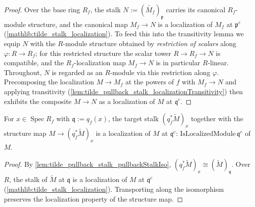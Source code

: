 \begin{proof}
  \leanok
  Over the base ring \(R_f\), the stalk \(N:=(\widetilde{M_f})_{\mathfrak p}\) carries its
  canonical \(R_f\)-module structure, and the canonical map \(M_f\to N\) is a localization
  of \(M_f\) at \(\mathfrak p^{c}\) (\cref{mathlib:tilde_stalk_localization}).  To feed this
  into the transitivity lemma we equip \(N\) with the \(R\)-module structure obtained by
  \emph{restriction of scalars} along \(\varphi:R\to R_f\); for this restricted structure
  the scalar tower \(R\to R_f\to N\) is compatible, and the \(R_f\)-localization map
  \(M_f\to N\) is in particular \(R\)-linear.  Throughout, \(N\) is regarded as an
  \(R\)-module via this restriction along \(\varphi\).
  Precomposing the localization \(M\to M_f\) at the powers of \(f\) with \(M_f\to N\) and
  applying transitivity (\cref{lem:tilde_pullback_stalk_localizationTransitivity}) then
  exhibits the composite \(M\to N\) as a localization of \(M\) at \(\mathfrak q^{c}\).
\end{proof}


\begin{lemma}
  \label{lem:tilde_pullback_stalk_target_isLocalizedModule}
  For \(x\in\operatorname{Spec}R_f\) with \(\mathfrak q:=q_f(x)\), the target stalk
  \((q_f^{*}\widetilde M)_x\) together with the structure map \(M\to(q_f^{*}\widetilde
  M)_x\) is a localization of \(M\) at \(\mathfrak q^{c}\):
  \(\mathrm{IsLocalizedModule}\,\mathfrak q^{c}\) of \(M\).
\end{lemma}

\begin{proof}
  By \cref{lem:tilde_pullback_stalk_pullbackStalkIso}, \((q_f^{*}\widetilde M)_x\cong
  (\widetilde M)_{\mathfrak q}\).  Over \(R\), the stalk of \(\widetilde M\) at
  \(\mathfrak q\) is a localization of \(M\) at \(\mathfrak q^{c}\)
  (\cref{mathlib:tilde_stalk_localization}).  Transporting along the isomorphism preserves
  the localization property of the structure map.
\end{proof}

